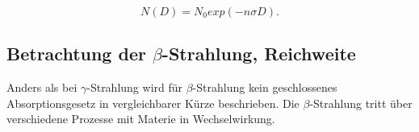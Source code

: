 \begin{equation}
N(D)=N_0 exp(-n \sigma D).
\end{equation}
\subsection{Betrachtung der $\beta$-Strahlung, Reichweite}
\label{sec:beta}
Anders als bei $\gamma$-Strahlung wird für  $\beta$-Strahlung kein geschlossenes Absorptionsgesetz in vergleichbarer Kürze beschrieben.
Die $\beta$-Strahlung tritt über verschiedene Prozesse mit Materie in Wechselwirkung.
